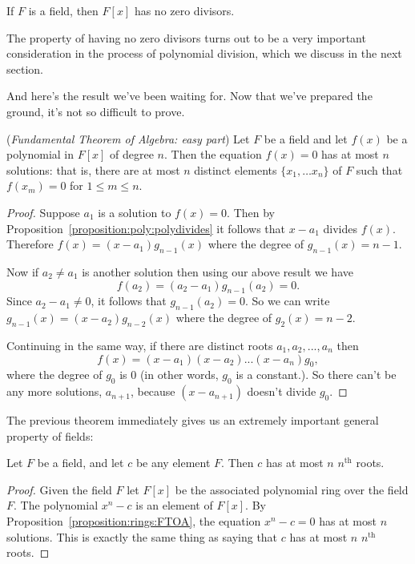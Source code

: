 \begin{prop}\label{proposition:rings:nozerodiv} If $F$ is a field, then $F[x]$ has no zero divisors.
\end{prop}

The property of having no zero divisors turns out to be a very important consideration in the process of polynomial division, which we discuss in the next section.

And here's the result we've been waiting for. Now that we've prepared the ground, it's not so difficult to prove.

\begin{prop}\label{proposition:rings:FTOA}(\emph{Fundamental Theorem of Algebra: easy part})
Let $F$ be a field and let $f(x)$ be a polynomial in $F[x]$ of degree $n$. Then the equation $f(x)=0$ has at most $n$ solutions: that is, there are at most $n$ distinct elements $\{x_1,\ldots x_n\}$ of $F$ such that $f(x_m)=0$ for $1 \le m \le n$.
\end{prop}


\begin{proof}
Suppose $a_1$ is a solution to $f(x)=0$. Then by Proposition~\ref{proposition:poly:polydivides} it follows that $x-a_1$ divides $f(x)$. Therefore $f(x) = (x-a_1) g_{n-1}(x)$ where the degree of $g_{n-1}(x)=n-1$. 

Now if $a_2 \neq a_1$ is another solution then using our above result we have
\[ f(a_2) = (a_2 - a_1)g_{n-1}(a_2) = 0. \]
Since $a_2 - a_1 \neq 0$, it follows that $g_{n-1}(a_2) = 0$. So we can write $g_{n - 1}(x) = (x-a_2)g_{n-2}(x)$ where the degree of $g_2(x) = n-2$. 

Continuing in the same way, if there are distinct roots $a_1,a_2,...,a_n$ then 
\[
f(x) = (x - a_1)(x - a_2)...(x - a_n)g_0, \]
 where the degree of $g_0$ is 0 (in other words, $g_0$ is a constant.). So there can't be any more solutions, $a_{n+1}$, because $(x-a_{n+1})$ doesn't divide $g_0$.
\end{proof}

The previous theorem immediately gives us an extremely important general property of fields:

\begin{prop}\label{proposition:rings:atmostnroots}
Let $F$ be a field, and let $c$ be any element $F$.  Then $c$ has at most $n$ $n^{\text{th}}$ roots.
\end{prop}


\begin{proof}
Given the field $F$ let $F[x]$ be the associated polynomial ring over the field $F$. The polynomial $x^n-c$ is an element of $F[x]$. By Proposition~\ref{proposition:rings:FTOA}, the equation $x^n-c=0$ has at most $n$ solutions.  This is exactly the same thing as saying that $c$ has at most $n$ $n^{\text{th}}$ roots.
\end{proof}

